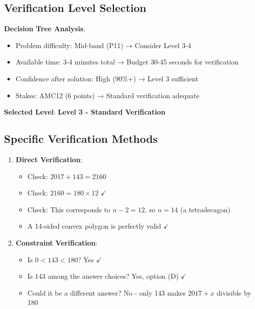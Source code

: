 \documentclass[]{article}
\begin{document}
\begin{verificationbox}
\subsection*{Verification Level Selection}

\textbf{Decision Tree Analysis}:
\begin{itemize}[leftmargin=*]
    \item Problem difficulty: Mid-band (P11) → Consider Level 3-4
    \item Available time: 3-4 minutes total → Budget 30-45 seconds for verification
    \item Confidence after solution: High (90\%+) → Level 3 sufficient
    \item Stakes: AMC12 (6 points) → Standard verification adequate
\end{itemize}

\textbf{Selected Level}: \textbf{Level 3 - Standard Verification}

\subsection*{Specific Verification Methods}

\begin{enumerate}[leftmargin=*]
    \item \textbf{Direct Verification}:
    \begin{itemize}
        \item Check: $2017 + 143 = 2160$
        \item Check: $2160 = 180 \times 12$ $\checkmark$
        \item Check: This corresponds to $n - 2 = 12$, so $n = 14$ (a tetradecagon)
        \item A 14-sided convex polygon is perfectly valid $\checkmark$
    \end{itemize}
    
    \item \textbf{Constraint Verification}:
    \begin{itemize}
        \item Is $0 < 143 < 180$? Yes $\checkmark$
        \item Is 143 among the answer choices? Yes, option (D) $\checkmark$
        \item Could it be a different answer? No - only 143 makes $2017 + x$ divisible by 180
    \end{itemize}
    

\end{enumerate}
\end{verificationbox}
\end{document}
